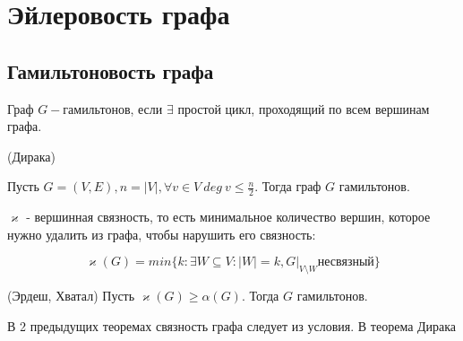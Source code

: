 \section{Эйлеровость графа}
\subsection{Гамильтоновость графа}
\begin{definition}
  Граф \(G - \)гамильтонов, если \(\exists\) простой цикл, проходящий по всем вершинам графа.
\end{definition}

\begin{theorem}{(Дирака)}

  Пусть \(G = (V, E), n = |V|, \forall v \in V \ deg \  v \le \frac{n}{2}\). Тогда граф \(G\) гамильтонов.
\end{theorem}

\begin{definition}
  \(\varkappa\) - вершинная связность, то есть минимальное количество вершин, которое нужно удалить из графа, чтобы нарушить его связность:

  \[\varkappa(G) = min \{k : \exists W \subseteq V: |W| = k, G |_{V 
  \setminus W} \text{несвязный}\}\]
\end{definition}
\begin{theorem}{(Эрдеш, Хватал)}
  Пусть \(\varkappa(G) \ge \alpha(G)\). Тогда \(G\) гамильтонов. 
  
\end{theorem}

\begin{note}
В 2 предыдущих теоремах связность графа следует из условия. В теорема Дирака 
\end{note}



